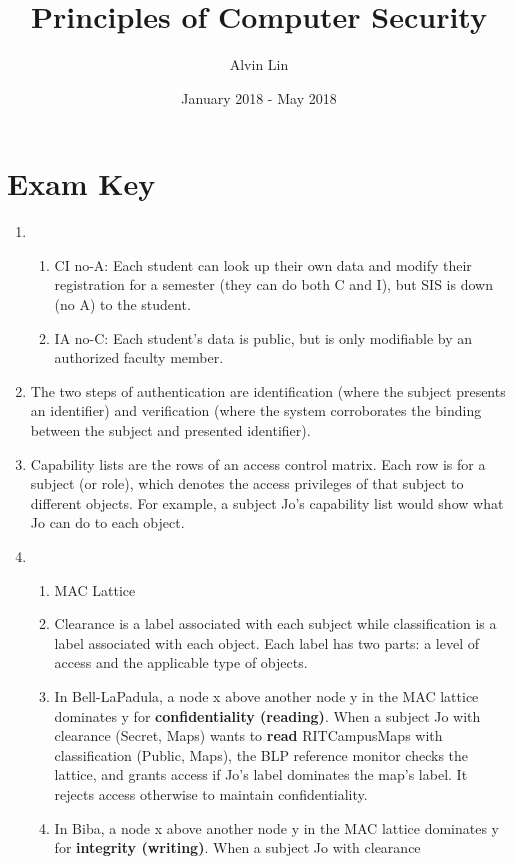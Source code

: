 \documentclass{math}
\title{Principles of Computer Security}
\author{Alvin Lin}
\date{January 2018 - May 2018}
\begin{document}
\maketitle

\section*{Exam Key}
\begin{enumerate}
  \item \begin{enumerate}
    \item CI no-A: Each student can look up their own data and modify their
    registration for a semester (they can do both C and I), but SIS is down (no
    A) to the student.
    \item IA no-C: Each student's data is public, but is only modifiable by
    an authorized faculty member.
  \end{enumerate}
  \item The two steps of authentication are identification (where the subject
  presents an identifier) and verification (where the system corroborates the
  binding between the subject and presented identifier).
  \item Capability lists are the rows of an access control matrix. Each row is
  for a subject (or role), which denotes the access privileges of that subject
  to different objects. For example, a subject Jo's capability list would show
  what Jo can do to each object.
  \item \begin{enumerate}
    \item MAC Lattice
    \item Clearance is a label associated with each subject while
    classification is a label associated with each object. Each label has two
    parts: a level of access and the applicable type of objects.
    \item In Bell-LaPadula, a node x above another node y in the MAC lattice
    dominates y for \textbf{confidentiality (reading)}. When a subject Jo with
    clearance (Secret, {Maps}) wants to \textbf{read} RITCampusMaps with
    classification (Public, {Maps}), the BLP reference monitor checks the
    lattice, and grants access if Jo's label dominates the map's label. It
    rejects access otherwise to maintain confidentiality.
    \item In Biba, a node x above another node y in the MAC lattice dominates
    y for \textbf{integrity (writing)}. When a subject Jo with clearance

\end{enumerate}
\end{enumerate}
\end{document}
